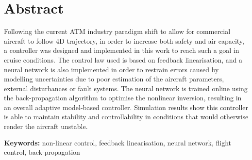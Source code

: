 
\section*{Abstract}


Following the current ATM industry paradigm shift to allow for commercial aircraft to follow 4D trajectory, in order to increase both safety and air capacity, a controller was designed and implemented in this work to reach such a goal in cruise conditions. The control law used is based on feedback linearisation, and a neural network is also implemented in order to restrain errors caused by modelling uncertainties due to poor estimation of the aircraft parameters, external disturbances or fault systems. The neural network is trained online using the back-propagation algorithm to optimise the nonlinear inversion, resulting in an overall adaptive model-based controller. Simulation results show this controller is able to maintain stability and controllability in conditions that would otherwise render the aircraft unstable.

\vfill

\textbf{\Large Keywords:} non-linear control, feedback linearisation, neural network, flight control, back-propagation

